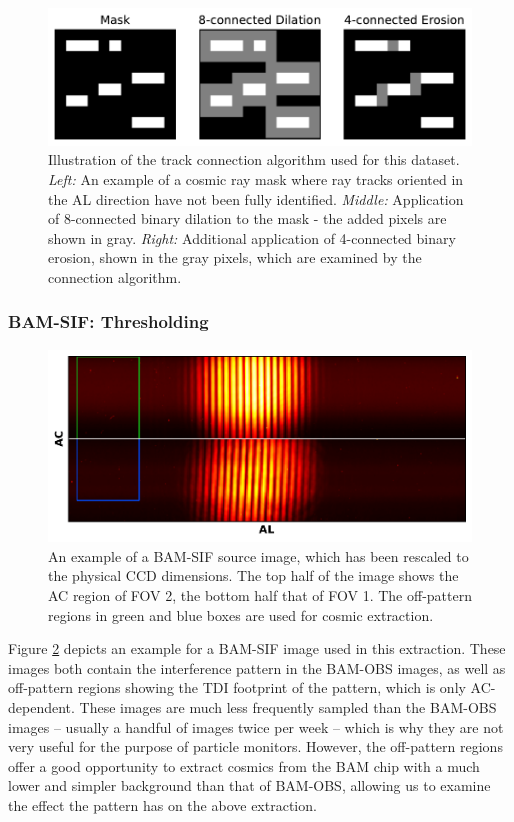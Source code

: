 \documentclass[a4paper, 11pt]{article}
\begin{document}
\begin{figure}
  \centering
  \includegraphics{images/BAM-OBS_connection}
  \caption{Illustration of the track connection algorithm used for this dataset. \textit{Left:} An example of a cosmic ray mask where ray tracks oriented in the AL direction have not been fully identified. \textit{Middle:} Application of 8-connected binary dilation to the mask - the added pixels are shown in gray. \textit{Right:} Additional application of 4-connected binary erosion, shown in the gray pixels, which are examined by the connection algorithm.}
  \label{fig:BAM_connection}
\end{figure}

\subsubsection{BAM-SIF: Thresholding}
\begin{figure}
  \centering
  \includegraphics{images/BAM-SIF_full_image}
  \caption{An example of a BAM-SIF source image, which has been rescaled to the physical CCD dimensions. The top half of the image shows the AC region of FOV 2, the bottom half that of FOV 1. The off-pattern regions in green and blue boxes are used for cosmic extraction.}
  \label{fig:BAM-SIF_full}
\end{figure}

Figure \ref{fig:BAM-SIF_full} depicts an example for a BAM-SIF image used in this extraction. These images both contain the interference pattern in the BAM-OBS images, as well as off-pattern regions showing the TDI footprint of the pattern, which is only AC-dependent. These images are much less frequently sampled than the BAM-OBS images -- usually a handful of images twice per week -- which is why they are not very useful for the purpose of particle monitors. However, the off-pattern regions offer a good opportunity to extract cosmics from the BAM chip with a much lower and simpler background than that of BAM-OBS, allowing us to examine the effect the pattern has on the above extraction.
\end{document}
